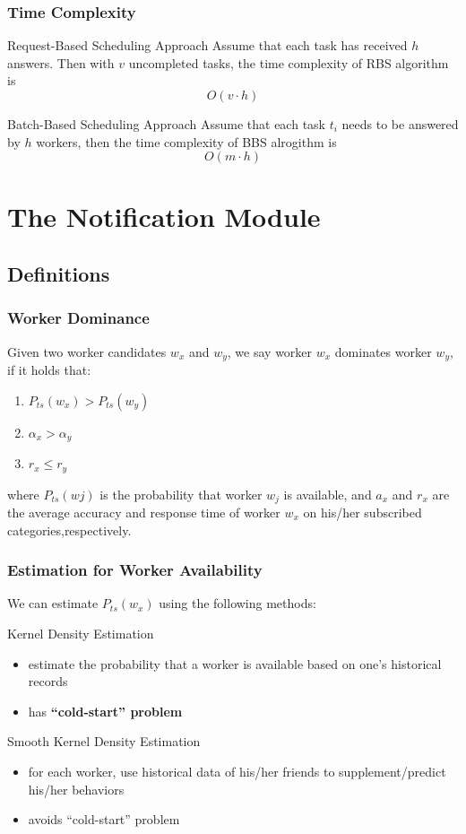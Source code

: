 \documentclass[UTF8]{beamer}
\begin{document}
\begin{frame}
    \frametitle{Time Complexity}
    \begin{block}{Request-Based Scheduling Approach}
        Assume that each task has received $h$ answers. Then
        with $v$ uncompleted tasks, the time complexity of RBS algorithm is
        $$O(v \cdot h)$$
    \end{block}
    \begin{block}{Batch-Based Scheduling Approach}
        Assume that each task $t_i$ needs to be answered 
        by $h$ workers, then the time complexity of BBS alrogithm is
        $$O(m \cdot h)$$
    \end{block}
\end{frame}

\section{The Notification Module}
\subsection{Definitions}

\begin{frame}
    \frametitle{Worker Dominance}
    Given two worker candidates $w_x$ and $w_y$, 
    we say worker $w_x$ dominates worker $w_y$, 
    if it holds that:
    \begin{enumerate}
        \item $P_{ts}(w_x) > P_{ts}(w_y)$
        \item $\alpha_x > \alpha_y$
        \item $r_x \leq r_y$
    \end{enumerate}
    where $P_{ts}(wj)$ is the probability that worker $w_j$
    is available, and $a_x$ and $r_x$ are the average 
    accuracy and response time of worker $w_x$ on 
    his/her subscribed categories,respectively.
\end{frame}


\begin{frame}
    \frametitle{Estimation for Worker Availability}
    We can estimate $P_{ts}(w_x)$ using the following methods:
    \begin{block}{Kernel Density Estimation}
        \begin{itemize}
            \item estimate the probability that a worker is available
            based on one’s historical records
            \item has \textbf{``cold-start'' problem}
        \end{itemize}
    \end{block}
    \begin{block}{Smooth Kernel Density Estimation}
        \begin{itemize}
            \item for each worker, use historical data of 
            his/her friends to supplement/predict his/her 
            behaviors
            \item avoids ``cold-start'' problem
        \end{itemize}
    \end{block}
\end{frame}
\end{document}
